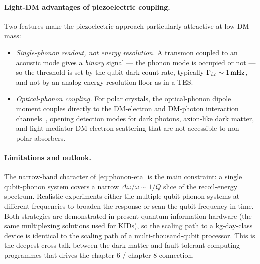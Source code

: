 \paragraph{Light-DM advantages of piezoelectric coupling.}
Two features make the piezoelectric approach particularly
attractive at low DM mass:
\begin{itemize}
  \item \emph{Single-phonon readout, not energy resolution.}
        A transmon coupled to an acoustic mode gives a
        \emph{binary} signal --- the phonon mode is occupied or
        not --- so the threshold is set by the qubit dark-count
        rate, typically $\Gamma_{\rm dc}\sim 1\,\text{mHz}$, and
        not by an analog energy-resolution floor as in a TES.
  \item \emph{Optical-phonon coupling.}
        For polar crystals, the optical-phonon dipole moment
        couples directly to the DM-electron and DM-photon
        interaction channels~\cite{knapen2018}, opening detection
        modes for dark photons, axion-like dark matter, and
        light-mediator DM-electron scattering that are not
        accessible to non-polar absorbers.
\end{itemize}

\paragraph{Limitations and outlook.}
The narrow-band character of \cref{eq:phonon-eta} is the main
constraint: a single qubit-phonon system covers a narrow
$\Delta\omega/\omega\sim 1/Q$ slice of the recoil-energy spectrum.
Realistic experiments either tile multiple qubit-phonon systems at
different frequencies to broaden the response or scan the qubit
frequency in time. Both strategies are demonstrated in present
quantum-information hardware (the same multiplexing solutions
used for KIDs), so the scaling path to a kg-day-class device is
identical to the scaling path of a multi-thousand-qubit processor.
This is the deepest cross-talk between the dark-matter and
fault-tolerant-computing programmes that drives the
chapter-6 / chapter-8 connection.
